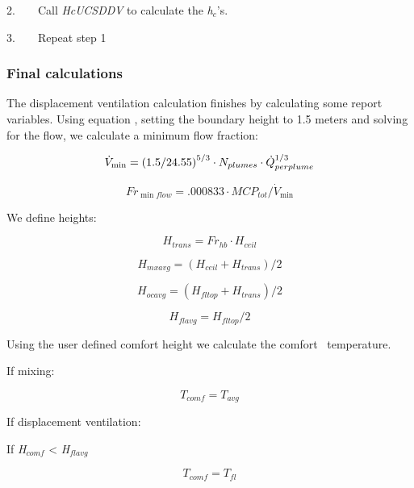 2.~~~~Call \emph{HcUCSDDV} to calculate the \emph{h\(_{c}\)}'s.

3.~~~~Repeat step 1

\subsubsection{Final calculations}\label{final-calculations}

The displacement ventilation calculation finishes by calculating some report variables. Using equation , setting the boundary height to 1.5 meters and solving for the flow, we calculate a minimum flow fraction:

\begin{equation}
{\dot V_{\min }} = {(1.5/{\rm{24}}{\rm{.55)}}^{{\rm{5/3}}}} \cdot {N_{plumes}} \cdot \dot Q_{perplume}^{1/3}
\end{equation}

\begin{equation}
F{r_{\min flow}} = .000833 \cdot MC{P_{tot}}/{\dot V_{\min }}
\end{equation}

We define heights:

\begin{equation}
{H_{trans}} = F{r_{hb}} \cdot {H_{ceil}}
\end{equation}

\begin{equation}
{H_{mxavg}} = ({H_{ceil}} + {H_{trans}})/2
\end{equation}

\begin{equation}
{H_{ocavg}} = ({H_{fltop}} + {H_{trans}})/2
\end{equation}

\begin{equation}
{H_{flavg}} = {H_{fltop}}/2
\end{equation}

Using the user defined comfort height we calculate the comfort~ temperature.

If mixing:

\begin{equation}
{T_{comf}} = {T_{avg}}
\end{equation}

If displacement ventilation:

If \emph{H\(_{comf}\)} \textless{} \emph{H\(_{flavg}\)}

\begin{equation}
{T_{comf}} = {T_{fl}}
\end{equation}

